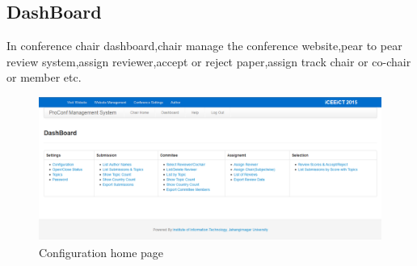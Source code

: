 \subsection{ DashBoard}
In conference chair dashboard,chair manage the conference website,pear to pear review system,assign reviewer,accept or reject paper,assign track chair or co-chair or member etc.

\begin{figure}[h!]
\centering
  \includegraphics[width=5in]{pic/configuration}
   \caption{Configuration home page }\label{configure}
\end{figure}

\newpage
